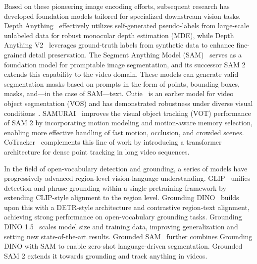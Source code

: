 \documentclass[10pt, a4paper, logo, copyright]{googledeepmind} %
\begin{document}
Based on these pioneering image encoding efforts, subsequent research has developed foundation models tailored for specialized downstream vision tasks. Depth Anything~\cite{yang2024depth} effectively utilizes self-generated pseudo-labels from large-scale unlabeled data for robust monocular depth estimation (MDE), while Depth Anything V2~\cite{yang2024depthv2} leverages ground-truth labels from synthetic data to enhance fine-grained detail preservation. The Segment Anything Model (SAM)~\cite{kirillov2023segment} serves as a foundation model for promptable image segmentation, and its successor SAM 2~\cite{ravi2024sam} extends this capability to the video domain. These models can generate valid segmentation masks based on prompts in the form of points, bounding boxes, masks, and---in the case of SAM---text. Cutie~\cite{cheng2024putting} is an earlier model for video object segmentation (VOS) and has demonstrated robustness under diverse visual conditions~\cite{zhong2025dexgraspvla}. 
SAMURAI~\cite{yang2024samurai} improves the visual object tracking (VOT) performance of SAM 2 by incorporating motion modeling and motion-aware memory selection, enabling more effective handling of fast motion, occlusion, and crowded scenes. CoTracker~\cite{karaev2024cotracker} complements this line of work by introducing a transformer architecture for dense point tracking in long video sequences.

In the field of open-vocabulary detection and grounding, a series of models have progressively advanced region-level vision-language understanding. GLIP~\cite{li2022grounded} unifies detection and phrase grounding within a single pretraining framework by extending CLIP-style alignment to the region level. Grounding DINO~\cite{liu2024grounding} builds upon this with a DETR-style architecture and contrastive region-text alignment, achieving strong performance on open-vocabulary grounding tasks. Grounding DINO 1.5~\cite{ren2024grounding} scales model size and training data, improving generalization and setting new state-of-the-art results. Grounded SAM~\cite{ren2024grounded} further combines Grounding DINO with SAM to enable zero-shot language-driven segmentation. Grounded SAM 2 extends it towards grounding and track anything in videos.
\end{document}
